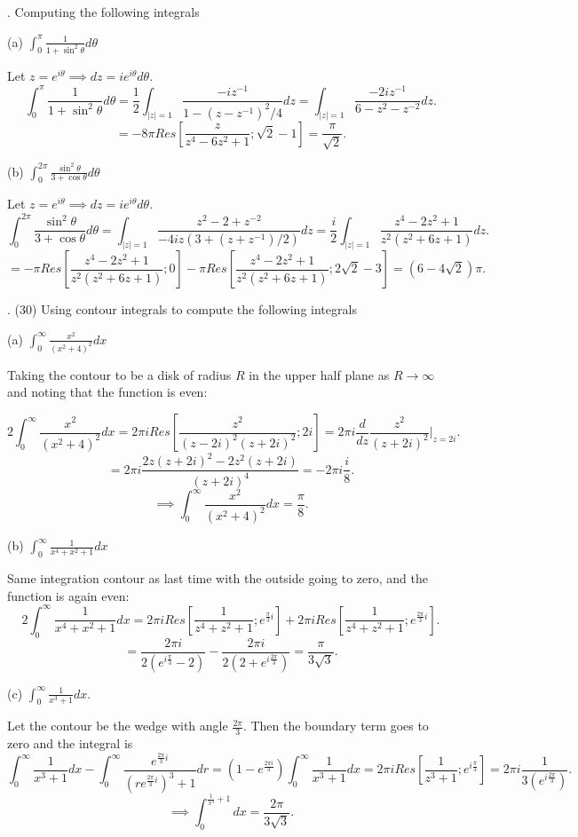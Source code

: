 \documentclass[letterpaper, reqno,11pt]{article}
\begin{document}
\medskip

. Computing the following integrals

(a) $\int_0^{\pi} \frac{1}{ 1+\sin^2 \theta} d \theta $

Let $z=e^{i\theta}\implies dz=ie^{i\theta}d\theta$. 
\[
\int_0^\pi \frac{1}{1+\sin^2\theta}d\theta=\frac{1}{2}\int_{|z|=1}\frac{-iz^{-1}}{1-\left( z-z^{-1} \right)^2 /4}dz=\int_{|z|=1}\frac{-2iz^{-1}}{6-z^2-z^{-2}}dz
.\]
\[
=-8\pi Res\left[\frac{z}{z^{4}-6z^2+1};\sqrt{2}-1 \right]=\frac{\pi}{\sqrt{2} }
.\]

(b) $ \int_0^{2\pi} \frac{ \sin^2 \theta}{ 3+\cos \theta} d \theta $

Let $z=e^{i\theta}\implies dz=ie^{i\theta}d\theta$. 
\[
\int_0^{2\pi}\frac{\sin^2\theta}{3+\cos\theta}d\theta=\int_{|z|=1}\frac{z^2-2+z^{-2}}{-4iz(3+(z+z^{-1}) /2)}dz=\frac{i}{2}\int_{|z|=1}\frac{z^4-2z^2+1}{z^2(z^2+6z+1)}dz
.\]
\[
=-\pi Res\left[ \frac{z^4-2z^2+1}{z^2(z^2+6z+1)};0\right]-\pi Res\left[ \frac{z^4-2z^2+1}{z^2(z^2+6z+1)};2\sqrt{2} -3\right]=\left( 6-4\sqrt{2}  \right) \pi
.\]


\medskip


. (30) Using contour integrals to  compute the following integrals

(a) $\int_0^\infty \frac{ x^2}{ (x^2+4)^2} dx$

Taking the contour to be a disk of radius $R$ in the upper half plane as $R\to \infty$ and noting that the function is even: 

\[
2\int_{0}^\infty \frac{x^2}{(x^2+4)^2}dx=2\pi iRes[\frac{z^2}{(z-2i)^2(z+2i)^2};2i]=2\pi i \frac{d}{dz} \frac{z^2}{(z+2i)^2}\bigg|_{z=2i}
.\]
\[
=2\pi i \frac{2z(z+2i)^2-2z^2(z+2i)}{(z+2i)^{4}}=-2\pi i\frac{i}{8}
.\]
\[
\implies \int_{0}^\infty \frac{x^2}{(x^2+4)^2}dx=\frac{\pi}{8}
.\]

(b) $ \int_0^\infty \frac{1}{ x^4+x^2+1} dx $

Same integration contour as last time with the outside going to zero, and the function is again even: 
\[
2\int_0^\infty \frac{1}{ x^4+x^2+1} dx=2\pi i Res[\frac{1}{ z^4+z^2+1};e^{\frac{\pi}{3}i}]+2\pi i Res[\frac{1}{ z^4+z^2+1};e^{\frac{2\pi}{3}i}]
.\]
\[
=\frac{2\pi i}{2\left( e^{i\frac{\pi}{3}}-2 \right) }-\frac{2\pi i}{2\left(2+e^{i \frac{2\pi}{3}}\right)}=\frac{\pi}{3\sqrt{3} }
.\]

(c) $\int_0^\infty \frac{1}{ x^3+1} dx $.

Let the contour be the wedge with angle $\frac{2\pi}{3}$. Then the boundary term goes to zero and the integral is 
\[
\int_0^{\infty}\frac{1}{x^3+1}dx-\int_0^\infty \frac{e^{\frac{2\pi}{3}i}}{\left( r e^{\frac{2\pi}{3}i} \right)^3+1 }dr=\left( 1-e^{\frac{2\pi i}{3}} \right) \int_0^{\infty}\frac{1}{x^3+1}dx=2\pi iRes[\frac{1}{z^3+1};e^{i\frac{\pi}{3}}]=2\pi i \frac{1}{3\left( e^{i \frac{2\pi}{3}} \right) }
.\]
\[
\implies \int_0^{\frac{1}{x^3}+1}dx=\frac{2\pi}{3\sqrt{3} }
.\]
\end{document}
